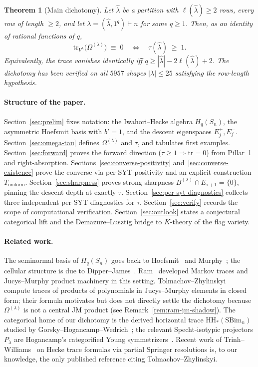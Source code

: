 \documentclass[11pt]{article}
\newtheorem{theorem}{Theorem}[section]
\theoremstyle{definition}
\newcommand{\Hq}{H_q}
\newcommand{\Sn}{S_n}
\newcommand{\Vlam}{V^{\lambda}}
\newcommand{\Om}{\Omega}
\newcommand{\bla}{\widehat\lambda}
\newcommand{\elh}{\ell(\bla)}
\newcommand{\tr}{\mathrm{tr}}
\newcommand{\Eplus}{E^{+}}
\newcommand{\Eminus}{E^{-}}
\newcommand{\Tunif}{T_{\mathrm{uniform}}}
\newcommand{\HHom}{\mathrm{HH}}
\newcommand{\SBim}{\mathrm{SBim}}
\begin{document}
\begin{theorem}[Main dichotomy]\label{thm:main-dichotomy}
Let $\bla$ be a partition with $\elh \ge 2$ rows, every row of length $\ge 2$, and let $\lambda = (\bla,1^q) \vdash n$ for some $q \ge 1$.  Then, as an identity of rational functions of $q$,
\[
   \tr_{\Vlam}\!\bigl(\Om^{(\lambda)}\bigr) \;\equiv\; 0
   \quad\Longleftrightarrow\quad
   \tau(\bla) \;\ge\; 1.
\]
Equivalently, the trace vanishes identically iff $q \ge |\bla| - 2\elh + 2$.  The dichotomy has been verified on all $5957$ shapes $|\lambda| \le 25$ satisfying the row-length hypothesis.
\end{theorem}

\paragraph{Structure of the paper.}
Section~\ref{sec:prelim} fixes notation: the Iwahori--Hecke algebra $\Hq(\Sn)$, the asymmetric Hoefsmit basis with $b'=1$, and the descent eigenspaces $\Eplus_j, \Eminus_j$.  Section~\ref{sec:omega-tau} defines $\Om^{(\lambda)}$ and $\tau$, and tabulates first examples.  Section~\ref{sec:forward} proves the forward direction ($\tau \ge 1 \Rightarrow \tr = 0$) from Pillar~1 and right-absorption.  Sections~\ref{sec:converse-positivity} and~\ref{sec:converse-existence} prove the converse via per-SYT positivity and an explicit construction $\Tunif$.  Section~\ref{sec:sharpness} proves strong sharpness $B^{(\lambda)} \cap \Eminus_{\tau+1} = \{0\}$, pinning the descent depth at exactly $\tau$.  Section~\ref{sec:per-syt-diagnostics} collects three independent per-SYT diagnostics for $\tau$.  Section~\ref{sec:verify} records the scope of computational verification.  Section~\ref{sec:outlook} states a conjectural categorical lift and the Demazure--Lusztig bridge to $K$-theory of the flag variety.

\paragraph{Related work.}
The seminormal basis of $\Hq(\Sn)$ goes back to Hoefsmit~\cite{hoefsmit1974} and Murphy~\cite{murphy1992seminormal}; the cellular structure is due to Dipper--James~\cite{dipperjames1986blocks}.  Ram~\cite{ram1991frobenius,ram2003Skew} developed Markov traces and Jucys--Murphy product machinery in this setting.  Tolmachov--Zhylinskyi~\cite{tolmachov2025markov} compute traces of products of polynomials in Jucys--Murphy elements in closed form; their formula motivates but does not directly settle the dichotomy because $\Om^{(\lambda)}$ is not a central JM product (see Remark~\ref{rem:ram-jm-shadow}).  The categorical home of our dichotomy is the derived horizontal trace $\HHom_*(\SBim_n)$ studied by Gorsky--Hogancamp--Wedrich~\cite{ghw2020derived}; the relevant Specht-isotypic projectors $P_\lambda$ are Hogancamp's categorified Young symmetrizers~\cite{hogancamp2015symmetrizers,abelhogancamp2015}.  Recent work of Trinh--Williams~\cite{trinhwilliams2026} on Hecke trace formulas via partial Springer resolutions is, to our knowledge, the only published reference citing Tolmachov--Zhylinskyi.
\end{document}
